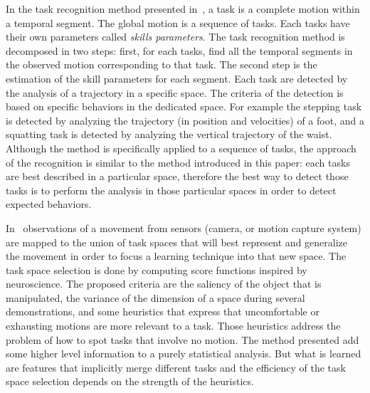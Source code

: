\documentclass[letterpaper, 10pt, conference]{ieeeconf}      %
\begin{document}
In the task recognition method presented in~\cite{nakaoka07}, a task is
a complete motion within a temporal segment. The global motion
is a sequence of tasks. Each tasks have their own
parameters called \emph{skills parameters}. The task recognition method is decomposed in two steps: 
first, for each tasks, find all the temporal segments in the observed motion
corresponding to that task.
The second step is the estimation of the skill parameters for each segment.
Each task are detected by the analysis of a trajectory in a specific space.
The criteria of the detection is based on specific behaviors in the dedicated space.
For example the stepping task is detected by analyzing the trajectory (in position and velocities) 
of a foot, and a squatting task is detected by analyzing the vertical trajectory of the waist.
Although the method is specifically applied to a sequence of tasks,
the approach of the recognition is similar to the method 
introduced in this paper: each tasks are best described in a particular
space, therefore the best way to detect those tasks is to perform the analysis in
those particular spaces in order to detect expected behaviors.

%
In~\cite{muhlig09} observations of a movement from sensors (camera, or motion capture system)
are mapped to the union of task spaces that will best represent and generalize the movement in order to focus
a learning technique into that new space. The task space selection is
done by computing score functions inspired by neuroscience. The proposed criteria are
the saliency of the object that is manipulated, the variance of the dimension
of a space during several demonstrations, and some heuristics that express that
uncomfortable or exhausting motions are more relevant to a task. Those heuristics
address the problem of how to spot tasks that involve no motion. The method
presented add some higher level information to a purely statistical analysis. 
But what is learned are features that implicitly merge different tasks and
the efficiency of the task space selection depends on the strength
of the heuristics.
\end{document}
